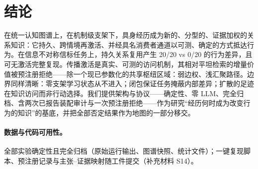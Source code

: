 \documentclass[10pt,a4paper]{ctexart}
\begin{document}
\section{结论}
在统一认知图谱上，在机制级支架下，具身经历成为新的、分型的、证据加权的关系知识：它持久、跨情境再激活、并经具名消费者通道以可测、确定的方式抵达行为。在信息不对称信标任务上，持久关系复用产生 20/20 vs 0/20 的行为差异，且可无激活完整复现。传播激活是真实、可测的访问机制，其相对平坦检索的增量价值被预注册拒绝——除一个现已参数化的共享枢纽区域：弱边权、浅汇聚路径。边界同样清晰：零支架学习状态从不进入；闭包保证任务掩蔽内部差异；扩散的足迹在知识访问而非行动选择。我们提供架构与协议——确定性、零 LLM、完全归档、含两次已报告装配审计与一次预注册拒绝——作为研究“经历何时成为改变行为的知识”的基底，并把全部否定结果作为地图的一部分移交。

\paragraph{数据与代码可用性。}全部实验确定性且完全归档（原始运行输出、图谱快照、统计文件）；一键复现脚本、预注册记录与主张--证据映射随工件提交（补充材料 S14）。



\end{document}
